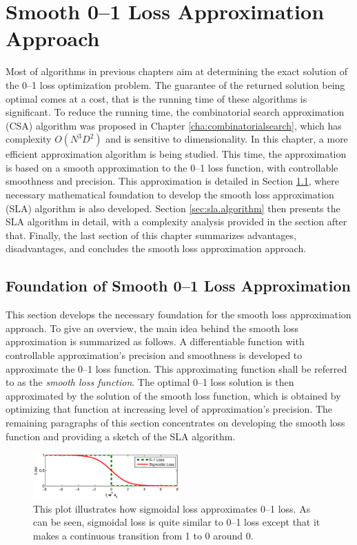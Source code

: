 \section{Smooth 0--1 Loss Approximation Approach}
\label{cha:Smoothlossapprox}

Most of algorithms in previous chapters aim at determining the exact solution of the 0--1 loss optimization problem. The guarantee of the returned solution being optimal comes at a cost, that is the running time of these algorithms is significant. To reduce the running time, the combinatorial search approximation (CSA) algorithm was proposed in Chapter \ref{cha:combinatorialsearch}, which has complexity $O(N^3D^2)$ and is sensitive to dimensionality. In this chapter, a more efficient approximation algorithm is being studied. This time, the approximation is based on a smooth approximation to the 0--1 loss function, with controllable smoothness and precision. This approximation is detailed in Section \ref{sec:sla.foundation}, where necessary mathematical foundation to develop the smooth loss approximation (SLA) algorithm is also developed. Section \ref{sec:sla.algorithm} then presents the SLA algorithm in detail, with a complexity analysis provided in the section after that. Finally, the last section of this chapter summarizes advantages, disadvantages, and concludes the smooth loss approximation approach.

\subsection{Foundation of Smooth 0--1 Loss Approximation}
\label{sec:sla.foundation}

This section develops the necessary foundation for the smooth loss approximation approach. To give an overview, the main idea behind the smooth loss approximation is summarized as follows. A differentiable function with controllable approximation's precision and smoothness is developed to approximate the 0--1 loss function. This approximating function shall be referred to as the \emph{smooth loss function}. The optimal 0--1 loss solution is then approximated by the solution of the smooth loss function, which is obtained by optimizing that function at increasing level of approximation's precision. The remaining paragraphs of this section concentrates on developing the smooth loss function and providing a sketch of the SLA algorithm. 

\begin{figure}[here]
\includegraphics[width=0.50\textwidth]{images/fig51_sigmoid.eps}
\caption{
This plot illustrates how sigmoidal loss approximates 0--1 loss. As can be seen, sigmoidal loss is quite similar to 0--1 loss except that it makes a continuous transition from 1 to 0 around 0.
}
\label{fig:sla.sigmoid}
\end{figure}

